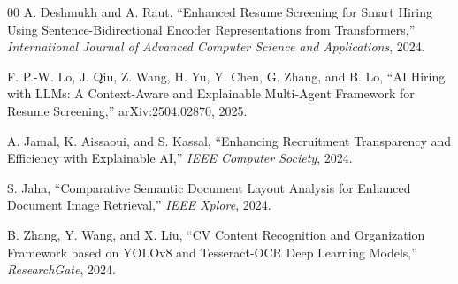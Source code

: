 \begin{thebibliography}{00}
 A. Deshmukh and A. Raut, ``Enhanced Resume Screening for Smart Hiring Using Sentence-Bidirectional Encoder Representations from Transformers,'' \textit{International Journal of Advanced Computer Science and Applications}, 2024.

 F. P.-W. Lo, J. Qiu, Z. Wang, H. Yu, Y. Chen, G. Zhang, and B. Lo, ``AI Hiring with LLMs: A Context-Aware and Explainable Multi-Agent Framework for Resume Screening,'' arXiv:2504.02870, 2025.

 A. Jamal, K. Aissaoui, and S. Kassal, ``Enhancing Recruitment Transparency and Efficiency with Explainable AI,'' \textit{IEEE Computer Society}, 2024.

 S. Jaha, ``Comparative Semantic Document Layout Analysis for Enhanced Document Image Retrieval,'' \textit{IEEE Xplore}, 2024.

 B. Zhang, Y. Wang, and X. Liu, ``CV Content Recognition and Organization Framework based on YOLOv8 and Tesseract-OCR Deep Learning Models,'' \textit{ResearchGate}, 2024.

\end{thebibliography}
\endgroup